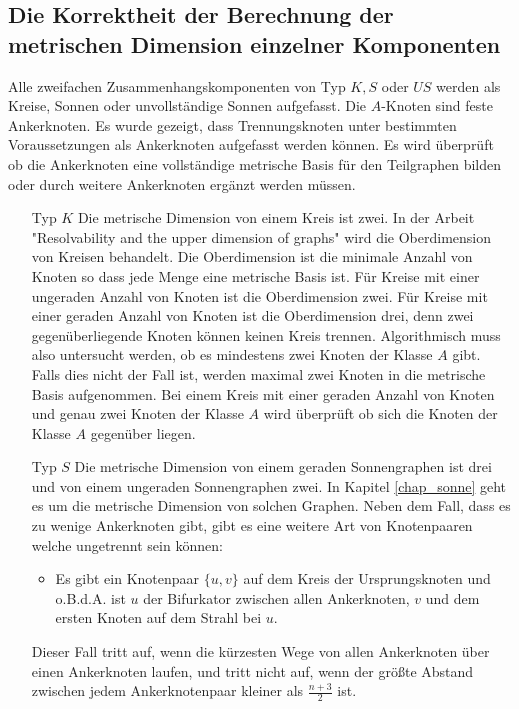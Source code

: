 \subsection{Die Korrektheit der Berechnung der metrischen Dimension einzelner Komponenten}
\label{korrkomp}\vspace{-3mm}
Alle zweifachen Zusammenhangskomponenten von Typ $K,S$ oder $US$ werden als Kreise, Sonnen oder unvollständige Sonnen aufgefasst. Die $A$-Knoten sind feste Ankerknoten. Es wurde gezeigt, dass Trennungsknoten unter bestimmten Voraussetzungen als Ankerknoten aufgefasst werden können. Es wird überprüft ob die Ankerknoten eine vollständige metrische Basis für den Teilgraphen bilden oder durch weitere Ankerknoten ergänzt werden müssen.
\begin{itemize}
\item[Typ $K$]
Die metrische Dimension von einem Kreis ist zwei. In der Arbeit "Resolvability and the upper dimension of graphs" \cite{upper} wird die Oberdimension von Kreisen behandelt. Die Oberdimension ist die minimale Anzahl von Knoten so dass jede Menge eine metrische Basis ist.\newline
Für Kreise mit einer ungeraden Anzahl von Knoten ist die Oberdimension zwei.\newline
Für Kreise mit einer geraden Anzahl von Knoten ist die Oberdimension drei, denn zwei gegenüberliegende Knoten können keinen Kreis trennen. Algorithmisch muss also untersucht werden, ob es mindestens zwei Knoten der Klasse $A$ gibt. Falls dies nicht der Fall ist, werden maximal zwei Knoten in die metrische Basis aufgenommen. Bei einem Kreis mit einer geraden Anzahl von Knoten und genau zwei Knoten der Klasse $A$ wird überprüft ob sich die Knoten der Klasse $A$ gegenüber liegen.
\item[Typ $S$]
Die metrische Dimension von einem geraden Sonnengraphen ist drei und von einem ungeraden Sonnengraphen zwei.
In Kapitel \ref{chap_sonne} geht es um die metrische Dimension von solchen Graphen. Neben dem Fall, dass es zu wenige Ankerknoten gibt, gibt es eine weitere Art von Knotenpaaren welche ungetrennt sein können:
\begin{itemize}
\item Es gibt ein Knotenpaar $\{u,v\}$ auf dem Kreis der Ursprungsknoten und o.B.d.A. ist $u$ der Bifurkator zwischen allen Ankerknoten, $v$ und dem ersten Knoten auf dem Strahl bei $u$.
\end{itemize}
Dieser Fall tritt auf, wenn die kürzesten Wege von allen Ankerknoten über einen Ankerknoten laufen, und tritt nicht auf, wenn der größte Abstand zwischen jedem Ankerknotenpaar kleiner als $\frac{n+3}{2}$ ist. 

\end{itemize}
